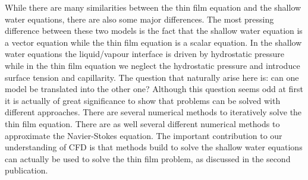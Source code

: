While there are many similarities between the thin film equation and the shallow water equations, there are also some major differences.
The most pressing difference between these two models is the fact that the shallow water equation is a vector equation while the thin film equation is a scalar equation.
In the shallow water equations the liquid/vapour interface is driven by hydrostatic pressure while in the thin film equation we neglect the hydrostatic pressure and introduce surface tension and capillarity.
The question that naturally arise here is: can one model be translated into the other one?
Although this question seems odd at first it is actually of great significance to show that problems can be solved with different approaches.
There are several numerical methods to iteratively solve the thin film equation.
There are as well several different numerical methods to approximate the Navier-Stokes equation.
The important contribution to our understanding of CFD is that methods build to solve the shallow water equations can actually be used to solve the thin film problem, as discussed in the second publication.
